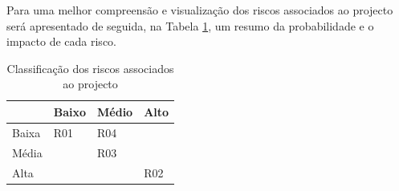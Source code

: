 Para uma melhor compreensão e visualização dos riscos associados ao projecto será apresentado de seguida, na Tabela \ref{tab:riscos}, um resumo da probabilidade e o impacto de cada risco.

\pagebreak
\mbox{}
\begin{table}
	\centering
\begin{tabular}{ | l | l | l | l |}
	\hline
	\diagbox[width=15em]{Impacto}{Probabilidade}
	& Baixo & Médio & Alto\\
	\hline
	Baixa & \cellcolor{green}\centering R01 & \cellcolor{yellow}R04& \cellcolor{orange}\\
	\hline
	Média & \cellcolor{yellow} & \cellcolor{orange}R03 & \cellcolor{darkOrange}\\
	\hline
	Alta & \cellcolor{orange} & \cellcolor{darkOrange} & \cellcolor{red}R02\\
	\hline
\end{tabular}
\begin{center}
\caption {Classificação dos riscos associados ao projecto}
\label {tab:riscos}
\end{center}
\end{table}










\blankpage

\glsresetall
